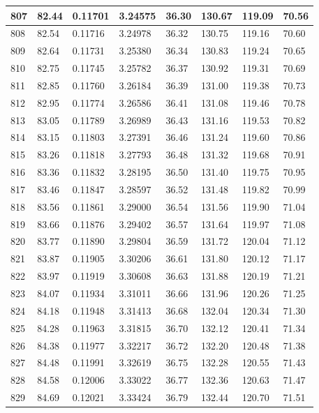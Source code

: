 \documentclass[12pt,a4paper,twoside]{article}
\begin{document}
\begin{center}
\begin{longtable}{l l l l | l l l l}
807 & 82.44 & 0.11701 & 3.24575 & 36.30 & 130.67 & 119.09 & 70.56 \\ \hline
808 & 82.54 & 0.11716 & 3.24978 & 36.32 & 130.75 & 119.16 & 70.60 \\ \hline
809 & 82.64 & 0.11731 & 3.25380 & 36.34 & 130.83 & 119.24 & 70.65 \\ \hline
810 & 82.75 & 0.11745 & 3.25782 & 36.37 & 130.92 & 119.31 & 70.69 \\ \hline
811 & 82.85 & 0.11760 & 3.26184 & 36.39 & 131.00 & 119.38 & 70.73 \\ \hline
812 & 82.95 & 0.11774 & 3.26586 & 36.41 & 131.08 & 119.46 & 70.78 \\ \hline
813 & 83.05 & 0.11789 & 3.26989 & 36.43 & 131.16 & 119.53 & 70.82 \\ \hline
814 & 83.15 & 0.11803 & 3.27391 & 36.46 & 131.24 & 119.60 & 70.86 \\ \hline
815 & 83.26 & 0.11818 & 3.27793 & 36.48 & 131.32 & 119.68 & 70.91 \\ \hline
816 & 83.36 & 0.11832 & 3.28195 & 36.50 & 131.40 & 119.75 & 70.95 \\ \hline
817 & 83.46 & 0.11847 & 3.28597 & 36.52 & 131.48 & 119.82 & 70.99 \\ \hline
818 & 83.56 & 0.11861 & 3.29000 & 36.54 & 131.56 & 119.90 & 71.04 \\ \hline
819 & 83.66 & 0.11876 & 3.29402 & 36.57 & 131.64 & 119.97 & 71.08 \\ \hline
820 & 83.77 & 0.11890 & 3.29804 & 36.59 & 131.72 & 120.04 & 71.12 \\ \hline
821 & 83.87 & 0.11905 & 3.30206 & 36.61 & 131.80 & 120.12 & 71.17 \\ \hline
822 & 83.97 & 0.11919 & 3.30608 & 36.63 & 131.88 & 120.19 & 71.21 \\ \hline
823 & 84.07 & 0.11934 & 3.31011 & 36.66 & 131.96 & 120.26 & 71.25 \\ \hline
824 & 84.18 & 0.11948 & 3.31413 & 36.68 & 132.04 & 120.34 & 71.30 \\ \hline
825 & 84.28 & 0.11963 & 3.31815 & 36.70 & 132.12 & 120.41 & 71.34 \\ \hline
826 & 84.38 & 0.11977 & 3.32217 & 36.72 & 132.20 & 120.48 & 71.38 \\ \hline
827 & 84.48 & 0.11991 & 3.32619 & 36.75 & 132.28 & 120.55 & 71.43 \\ \hline
828 & 84.58 & 0.12006 & 3.33022 & 36.77 & 132.36 & 120.63 & 71.47 \\ \hline
829 & 84.69 & 0.12021 & 3.33424 & 36.79 & 132.44 & 120.70 & 71.51 \\ \hline

\end{longtable}
\end{center}
\end{document}
